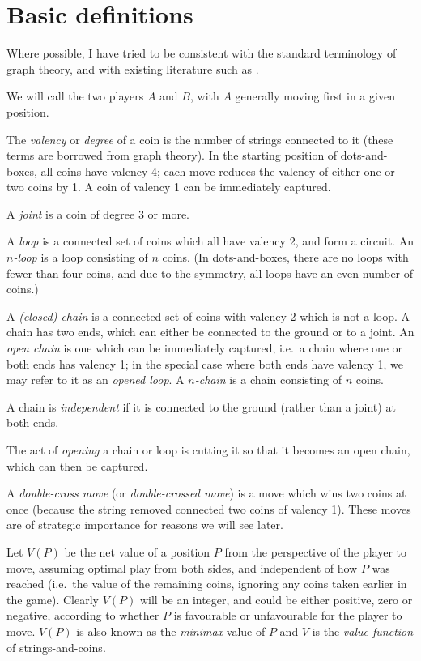 \documentclass[a4paper,twocolumn]{article}
\begin{document}
\section{Basic definitions}

Where possible, I have tried to be consistent with the standard
terminology of graph theory, and with existing literature such as
\cite{berl}.

We will call the two players $A$ and $B$, with $A$ generally moving
first in a given position.

The \emph{valency} or \emph{degree} of a coin is the number of strings
connected to it (these terms are borrowed from graph theory). In the
starting position of dots-and-boxes, all coins have valency 4; each
move reduces the valency of either one or two coins by 1. A coin of
valency 1 can be immediately captured.

A \emph{joint} is a coin of degree 3 or more.

A \emph{loop} is a connected set of coins which all have valency 2,
and form a circuit. An \emph{$n$-loop} is a loop consisting of $n$
coins. (In dots-and-boxes, there are no loops with fewer than four
coins, and due to the symmetry, all loops have an even number of
coins.)

A \emph{(closed) chain} is a connected set of coins with valency 2
which is not a loop. A chain has two ends, which can either be
connected to the ground or to a joint. An \emph{open chain} is one
which can be immediately captured, i.e.\ a chain where one or both
ends has valency 1; in the special case where both ends have valency
1, we may refer to it as an \emph{opened loop}. A \emph{$n$-chain} is
a chain consisting of $n$ coins.

A chain is \emph{independent} if it is connected to the ground (rather
than a joint) at both ends.

The act of \emph{opening} a chain or loop is cutting it so that it
becomes an open chain, which can then be captured.

A \emph{double-cross move} (or \emph{double-crossed move}) is a move
which wins two coins at once (because the string removed connected two
coins of valency 1). These moves are of strategic importance for
reasons we will see later.

Let $V(P)$ be the net value of a position $P$ from the perspective of
the player to move, assuming optimal play from both sides, and
independent of how $P$ was reached (i.e.\ the value of the remaining
coins, ignoring any coins taken earlier in the game). Clearly $V(P)$
will be an integer, and could be either positive, zero or negative,
according to whether $P$ is favourable or unfavourable for the player
to move. $V(P)$ is also known as the \emph{minimax} value of $P$ and
$V$ is the \emph{value function} of strings-and-coins.
\end{document}
